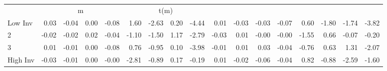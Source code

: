 \begin{table}[!ht]
\begin{tabular}{lrrrrrrrrrrrrrrrr}
      & \multicolumn{4}{c}{m} & \multicolumn{4}{c}{t(m)}
    
    \\
      \cmidrule(r){2-5} \cmidrule(r){6-9} \cmidrule(r){10-13} \cmidrule(r){14-17}

    Low Inv   & 0.03  & -0.04  & 0.00  & -0.08  & 1.60  & -2.63  & 0.20  & -4.44  & 0.01  & -0.03  & -0.03  & -0.07  & 0.60  & -1.80  & -1.74  & -3.82  \\
           2  & -0.02  & -0.02  & 0.02  & -0.04  & -1.10  & -1.50  & 1.17  & -2.79  & -0.03  & 0.01  & -0.00  & -0.00  & -1.55  & 0.66  & -0.07  & -0.20  \\
           3  & 0.01  & -0.01  & 0.00  & -0.08  & 0.76  & -0.95  & 0.10  & -3.98  & -0.01  & 0.01  & 0.03  & -0.04  & -0.76  & 0.63  & 1.31  & -2.07  \\
    High Inv  & -0.03  & -0.01  & 0.00  & -0.00  & -2.81  & -0.89  & 0.17  & -0.19  & 0.01  & -0.02  & -0.06  & -0.04  & 0.82  & -0.88  & -2.59  & -1.60  \\

  

  \bottomrule
\end{tabular}
\label{tbl:32_Size_BM_Inv_F17}
\end{table}